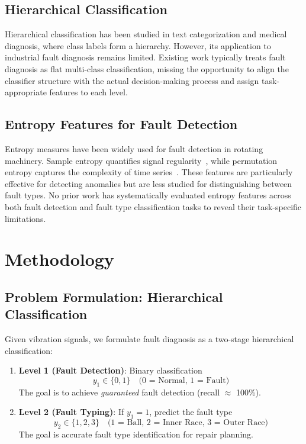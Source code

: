 \documentclass[11pt]{article}
\begin{document}
\subsection{Hierarchical Classification}
Hierarchical classification has been studied in text categorization and medical diagnosis, where class labels form a hierarchy. However, its application to industrial fault diagnosis remains limited. Existing work typically treats fault diagnosis as flat multi-class classification, missing the opportunity to align the classifier structure with the actual decision-making process and assign task-appropriate features to each level.

\subsection{Entropy Features for Fault Detection}
Entropy measures have been widely used for fault detection in rotating machinery. Sample entropy quantifies signal regularity~\cite{richman2000physiological}, while permutation entropy captures the complexity of time series~\cite{bandt2002permutation}. These features are particularly effective for detecting anomalies but are less studied for distinguishing between fault types. No prior work has systematically evaluated entropy features across both fault detection and fault type classification tasks to reveal their task-specific limitations.

\section{Methodology}

\subsection{Problem Formulation: Hierarchical Classification}
Given vibration signals, we formulate fault diagnosis as a two-stage hierarchical classification:

\begin{enumerate}
    \item \textbf{Level 1 (Fault Detection)}: Binary classification
    \[
    y_1 \in \{0, 1\} \quad \text{(0 = Normal, 1 = Fault)}
    \]
    The goal is to achieve \emph{guaranteed} fault detection (recall $\approx$ 100\%).

    \item \textbf{Level 2 (Fault Typing)}: If $y_1 = 1$, predict the fault type
    \[
    y_2 \in \{1, 2, 3\} \quad \text{(1 = Ball, 2 = Inner Race, 3 = Outer Race)}
    \]
    The goal is accurate fault type identification for repair planning.
\end{enumerate}
\end{document}
